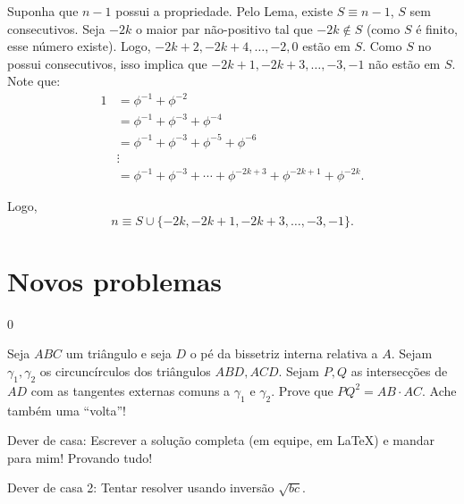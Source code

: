\documentclass[11pt,a4paper]{article}
\begin{document}
\begin{sol}
		Suponha que $n - 1$ possui a propriedade. Pelo Lema, existe $S \equiv n - 1$, $S$ sem consecutivos. 
		Seja $-2k$ o maior par não-positivo tal que $-2k \not\in S$ (como $S$ é finito, esse número existe).
		Logo, $-2k+2, -2k+4, \dots, -2, 0$ estão em $S$. Como $S$ no possui consecutivos, isso implica que $-2k+1, -2k+3, \dots, -3, -1$ não estão em $S$. Note que:
		\begin{align*}
			1 &= \phi^{-1} + \phi^{-2}\\
			  &= \phi^{-1} + \phi^{-3} + \phi^{-4}\\
			  &= \phi^{-1} + \phi^{-3} + \phi^{-5} + \phi^{-6}\\
			  &\vdots\\
			  &= \phi^{-1} + \phi^{-3} + \cdots + \phi^{-2k+3} + \phi^{-2k+1} + \phi^{-2k}.
		\end{align*}

		Logo, \[n \equiv S \cup \{-2k, -2k+1, -2k+3, \dots, -3, -1\}.\]

	\end{sol}

	\newpage

	\newpage
	\section{Novos problemas}
	\setcounter{prob}0
	\begin{prob}
		Seja $ABC$ um triângulo e seja $D$ o pé da bissetriz interna relativa a $A$. Sejam $\gamma_1, \gamma_2$ os circuncírculos dos triângulos $ABD, ACD$. Sejam $P, Q$ as intersecções de $AD$ com as tangentes externas comuns a $\gamma_1$ e  $\gamma_2$. Prove que $PQ^2 = AB \cdot AC$. Ache também uma ``volta''!
	\end{prob}

		Dever de casa: Escrever a solução completa (em equipe, em \LaTeX) e mandar para mim! Provando tudo!

		Dever de casa 2: Tentar resolver usando inversão $\sqrt{bc}$.
\end{document}
